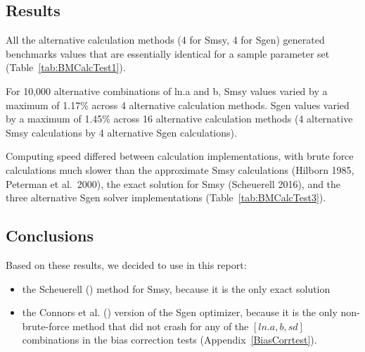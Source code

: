 \documentclass[french,11pt]{book}
\begin{document}
\subsection{Results}\label{results-4}

All the alternative calculation methods (4 for Smsy, 4 for Sgen) generated benchmarks values that are essentially identical for a sample parameter set (Table~\ref{tab:BMCalcTest1}).

For 10,000 alternative combinations of ln.a and b, Smsy values varied by a maximum of 1.17\% across 4 alternative calculation methods. Sgen values varied by a maximum of 1.45\% across 16 alternative calculation methods (4 alternative Smsy calculations by 4 alternative Sgen calculations).

Computing speed differed between calculation implementations, with brute force calculations much slower than the approximate Smsy calculations (Hilborn 1985, Peterman et al.~2000), the exact solution for Smsy (Scheuerell 2016), and the three alternative Sgen solver implementations (Table~\ref{tab:BMCalcTest3}).

\subsection{Conclusions}\label{conclusions-2}

Based on these results, we decided to use in this report:
\begin{itemize}

\item
  the Scheuerell () method for Smsy, because it is the only exact solution
\item
  the Connors et al. () version of the Sgen optimizer, because it is the only non-brute-force method that did not crash for any of the \([ln.a, b, sd]\) combinations in the bias correction tests (Appendix~\ref{BiasCorrtest}).
\end{itemize}
\clearpage
\end{document}
